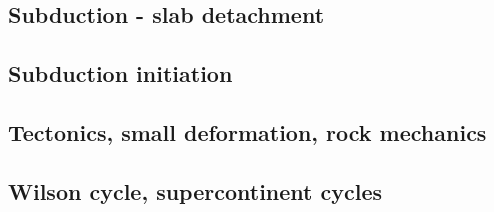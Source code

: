 \cite{jarr86}
\cite{hstt90}
\cite{zhgu92}
\cite{jope93}
\cite{zhgu94}
\cite{hajc97}
\cite{itki98}
\cite{hagu99}
\cite{jalo05}\cite{lahb05}
\cite{artd07}\cite{yaab07}
\cite{yaba08}\cite{ozrs08}
\cite{yahb09}
\cite{hagr10}
\cite{lobh10}
\cite{lixg11}\cite{list11}
\cite{anwb12}\cite{jahu12}\cite{jabi12}\cite{jabk12}\cite{lixg12}\cite{lixg13}
\cite{nabg13}\cite{hage13}\cite{ancv13}\cite{namu13}\cite{yosh13}\cite{zhgt13}\cite{jabr13}\cite{izht13}
\cite{luws13}
\cite{hond14}

\subsection*{Subduction - slab detachment}

\cite{yowo95}
\cite{anbi09}

\subsection*{Subduction initiation}

\cite{hags03}
\cite{nigm10}


\subsection*{Tectonics, small deformation, rock mechanics}

\cite{ilma93}
\cite{hept96}
\cite{lega12}

\subsection*{Wilson cycle, supercontinent cycles}

\cite{zhzl07}
\cite{zhzm09}





